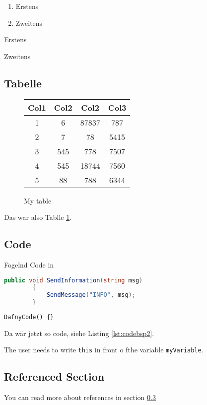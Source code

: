 \begin{enumerate}
    \item Erstens
    \item Zweitens
\end{enumerate}

\begin{description}
    \item Erstens
    \item Zweitens
\end{description}

\subsection{Tabelle}
\begin{figure}[!h]
    \centering
  \begin{tabular}{| c | c | c | c |}
    \hline
    Col1 & Col2 & Col2 & Col3 \\ [0.5ex]
    \hline\hline
    1 & 6 & 87837 & 787 \\
    \hline
    2 & 7 & 78 & 5415 \\
    \hline
    3 & 545 & 778 & 7507 \\
    \hline
    4 & 545 & 18744 & 7560 \\
    \hline
    5 & 88 & 788 & 6344 \\ [1ex]
    \hline
  \end{tabular}
  \label{tab:tabbsp}
  \caption{My table}
\end{figure}
Das war also Tablle \ref{tab:tabbsp}.

\subsection{Code}
Fogelnd Code in \Csharp

\begin{lstlisting}[language=csharp, caption={My Caption}, captionpos=b, label={lst:codebsp}]
        public void SendInformation(string msg)
        {
            SendMessage("INFO", msg);
        }
\end{lstlisting}

\begin{lstlisting}[language=dafny, caption={My Caption}, captionpos=b, label={lst:codebsp2}]
        DafnyCode() {}
\end{lstlisting}
Da wär jetzt so code, siehe Listing \ref{lst:codebsp2}.

The user needs to write \texttt{this} in front o fthe variable \texttt{myVariable}.

\subsection{Referenced Section}
\label{section:my}
You can read more about references in section \ref{section:my}

